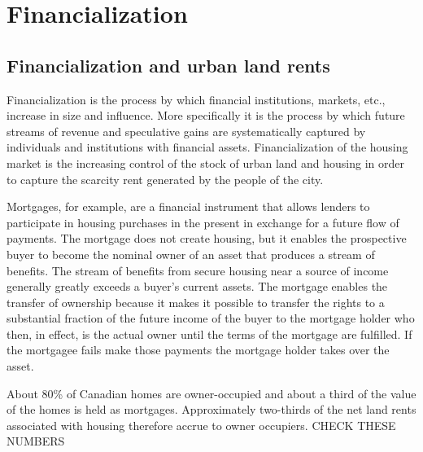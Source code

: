 \chapter{Financialization} \label{chapter-financialization}

\section{Financialization and urban land rents}

Financialization is the process by which financial institutions, markets, etc., increase in size and influence. More specifically it is the process by which future streams of revenue and speculative gains are systematically captured by individuals and institutions with financial assets. Financialization of the housing market is the increasing control of the stock of urban land and housing in order to capture the scarcity rent generated by the people of the city.  

Mortgages, for example, are a financial instrument that allows lenders to  participate in housing purchases in the present in exchange for a future flow of payments.  The mortgage does not create housing, but it enables the prospective buyer to become the nominal owner of an asset that produces a stream of benefits. The stream of benefits from secure housing near a source of income generally greatly exceeds a buyer's current assets. The mortgage enables the  transfer of ownership because it makes it possible to transfer the rights to a substantial fraction of the future income of the buyer to the mortgage holder who then, in effect, is the actual owner until the terms of the mortgage are fulfilled.  If the mortgagee fails make those payments the mortgage holder  takes over the asset. 

About 80\% of Canadian homes are owner-occupied and about a third of the  value of the homes is held as mortgages. Approximately two-thirds of the net land rents associated with housing therefore accrue to owner occupiers. {\color {red}CHECK THESE NUMBERS } 


\begin{center}
\end{center}

